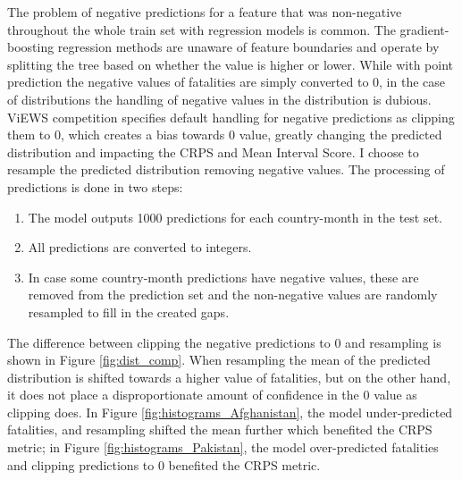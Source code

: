 \documentclass[runningheads]{llncs}
\begin{document}
    The problem of negative predictions for a feature that was non-negative throughout the whole train set with regression models is common. The gradient-boosting regression methods are unaware of feature boundaries and operate by splitting the tree based on whether the value is higher or lower. While with point prediction the negative values of fatalities are simply converted to 0, in the case of distributions the handling of negative values in the distribution is dubious. ViEWS competition specifies default handling for negative predictions as clipping them to 0, which creates a bias towards 0 value, greatly changing the predicted distribution and impacting the CRPS and Mean Interval Score. I choose to resample the predicted distribution removing negative values. The processing of predictions is done in two steps:
    \begin{enumerate}
        \item The model outputs 1000 predictions for each country-month in the test set.
        \item All predictions are converted to integers.
        \item In case some country-month predictions have negative values, these are removed from the prediction set and the non-negative values are randomly resampled to fill in the created gaps.
    \end{enumerate}

    The difference between clipping the negative predictions to 0 and resampling is shown in Figure \ref{fig:dist_comp}. When resampling the mean of the predicted distribution is shifted towards a higher value of fatalities, but on the other hand, it does not place a disproportionate amount of confidence in the 0 value as clipping does. In Figure \ref{fig:histograms_Afghanistan}, the model under-predicted fatalities, and resampling shifted the mean further which benefited the CRPS metric; in Figure \ref{fig:histograms_Pakistan}, the model over-predicted fatalities and clipping predictions to 0 benefited the CRPS metric.
\end{document}
